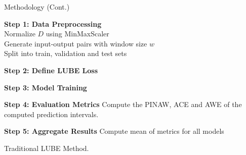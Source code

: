 \documentclass[xcolor=dvipsnames,aspectratio=169]{beamer}
\begin{document}
\begin{frame}{Methodology (Cont.)}
        \begin{algorithm}[H]
        \tiny
        \SetAlgoCaptionSeparator{:}
        
        
        \textbf{Step 1: Data Preprocessing}\\
        Normalize $D$ using MinMaxScaler\\
        Generate input-output pairs with window size $w$\\
        Split into train, validation and test sets
        
        \textbf{Step 2: Define LUBE Loss}\\
        
        \textbf{Step 3: Model Training}
        
        \textbf{Step 4: Evaluation Metrics} Compute the PINAW, ACE and AWE of the computed prediction intervals.
        
        \textbf{Step 5: Aggregate Results} Compute mean of metrics for all models
        
        \caption{Traditional LUBE Method.}
        \end{algorithm}

    
\end{frame}
\end{document}

